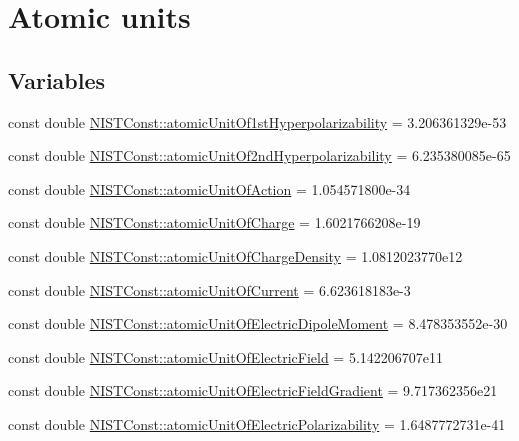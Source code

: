 \hypertarget{group___atomic_unit}{}\section{Atomic units}
\label{group___atomic_unit}
\subsection*{Variables}
\begin{DoxyCompactItemize}
\item 
const double \hyperlink{group___atomic_unit_gaa43ceaed22f3b69aee64d117cae645fb}{N\+I\+S\+T\+Const\+::atomic\+Unit\+Of1st\+Hyperpolarizability} = 3.\+206361329e-\/53
\item 
const double \hyperlink{group___atomic_unit_ga55b22fa50aa069b98aa1bcb050206a8e}{N\+I\+S\+T\+Const\+::atomic\+Unit\+Of2nd\+Hyperpolarizability} = 6.\+235380085e-\/65
\item 
const double \hyperlink{group___atomic_unit_ga6685e215d87395646fc18e2efa30d7a0}{N\+I\+S\+T\+Const\+::atomic\+Unit\+Of\+Action} = 1.\+054571800e-\/34
\item 
const double \hyperlink{group___atomic_unit_ga1a42bd5db581dc5bf7a87b864bc77cf4}{N\+I\+S\+T\+Const\+::atomic\+Unit\+Of\+Charge} = 1.\+6021766208e-\/19
\item 
const double \hyperlink{group___atomic_unit_gaa1918065ee8731837afe6bddee194320}{N\+I\+S\+T\+Const\+::atomic\+Unit\+Of\+Charge\+Density} = 1.\+0812023770e12
\item 
const double \hyperlink{group___atomic_unit_ga6d0f3cfc8aaa2aeb120559aaea2dc5c6}{N\+I\+S\+T\+Const\+::atomic\+Unit\+Of\+Current} = 6.\+623618183e-\/3
\item 
const double \hyperlink{group___atomic_unit_ga108a8be4e32eddd7cdfdf4473f3532ab}{N\+I\+S\+T\+Const\+::atomic\+Unit\+Of\+Electric\+Dipole\+Moment} = 8.\+478353552e-\/30
\item 
const double \hyperlink{group___atomic_unit_gab8b246e91a41cadb97f128210a6c81db}{N\+I\+S\+T\+Const\+::atomic\+Unit\+Of\+Electric\+Field} = 5.\+142206707e11
\item 
const double \hyperlink{group___atomic_unit_ga45f55b90a26e2e96f00c2664ddd79f11}{N\+I\+S\+T\+Const\+::atomic\+Unit\+Of\+Electric\+Field\+Gradient} = 9.\+717362356e21
\item 
const double \hyperlink{group___atomic_unit_ga5809393ec8d30cbb7e0c7a2f168e48ec}{N\+I\+S\+T\+Const\+::atomic\+Unit\+Of\+Electric\+Polarizability} = 1.\+6487772731e-\/41
\item 

\end{DoxyCompactItemize}
